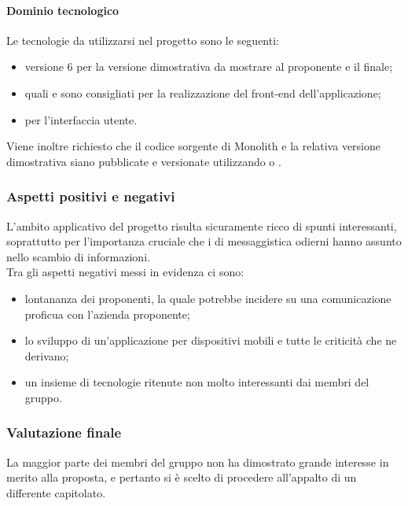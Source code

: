 			\paragraph{Dominio tecnologico}
			Le tecnologie da utilizzarsi nel progetto sono le seguenti:
			\begin{itemize}
				\item {} versione 6 per la versione dimostrativa da mostrare al proponente e il  finale;
				\item {} quali  e  sono consigliati per la realizzazione del front-end dell'applicazione;
				\item {} per l'interfaccia utente.
			\end{itemize}
			Viene inoltre richiesto che il codice sorgente di Monolith e la relativa versione dimostrativa siano pubblicate e versionate utilizzando 
			 o .
		\subsubsection{Aspetti positivi e negativi}
		L'ambito applicativo del progetto risulta sicuramente ricco di spunti interessanti, soprattutto per l'importanza cruciale che i  di 
		messaggistica odierni hanno assunto nello scambio di informazioni.
		\\Tra gli aspetti negativi messi in evidenza ci sono:
		\begin{itemize}
			\item lontananza dei proponenti, la quale potrebbe incidere su una comunicazione proficua con l'azienda proponente;
			\item lo sviluppo di un'applicazione per dispositivi mobili e tutte le criticità che ne derivano;
			\item un insieme di tecnologie ritenute non molto interessanti dai membri del gruppo.
		\end{itemize}
		\subsubsection{Valutazione finale}
		La maggior parte dei membri del gruppo non ha dimostrato grande interesse in merito alla proposta, e pertanto si è scelto di procedere 
		all'appalto di un differente capitolato.

